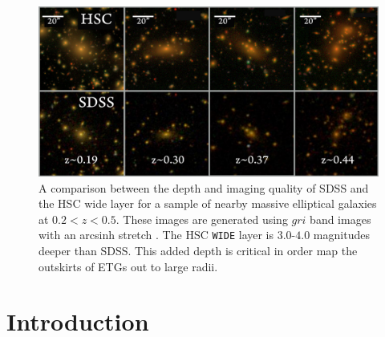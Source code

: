\documentclass[a4paper,fleqn,usenatbib]{mnras}
\begin{document}

    \begin{figure}
        \centering 
        \includegraphics[width=\textwidth]{fig/redbcg_sdss_compare}
        \caption{
            A comparison between the depth and imaging quality of SDSS and the HSC wide 
            layer for a sample of nearby massive elliptical galaxies at $0.2 < z < 0.5$.  
            These images are generated using $gri$ band images with an arcsinh stretch 
            \citep{Lupton2004}. 
            The HSC \texttt{WIDE} layer is $3.0$-$4.0$ magnitudes deeper than SDSS.
            This added depth is critical in order map the outskirts of ETGs out to 
            large radii.
            }
        \label{fig:sdss_compare}
    \end{figure}

\section{Introduction}
    \label{sec:intro}
\end{document}
